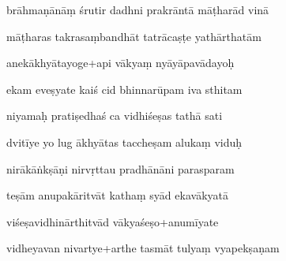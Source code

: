 \documentclass[article,12pt,a4paper]{memoir}%
\newcounter{parCount}
\begin{document}
	  
	  \pstart {} brāhmaṇānāṃ śrutir dadhni prakrāntā māṭharād vinā 
	{}
	\pend%
      

	  
	  \pstart \leavevmode%
	māṭharas takrasaṃbandhāt tatrācaṣṭe yathārthatām 
	{}
	\pend%
      

	  
	  \pstart {} anekākhyātayoge+api vākyaṃ nyāyāpavādayoḥ 
	{}
	\pend%
      

	  
	  \pstart \leavevmode%
	ekam eveṣyate kaiś cid bhinnarūpam iva sthitam 
	{}
	\pend%
      

	  
	  \pstart {} niyamaḥ pratiṣedhaś ca vidhiśeṣas tathā sati 
	{}
	\pend%
      

	  
	  \pstart \leavevmode%
	dvitīye yo lug ākhyātas taccheṣam alukaṃ viduḥ 
	{}
	\pend%
      

	  
	  \pstart {} nirākāṅkṣāṇi nirvṛttau pradhānāni parasparam 
	{}
	\pend%
      

	  
	  \pstart \leavevmode%
	teṣām anupakāritvāt kathaṃ syād ekavākyatā 
	{}
	\pend%
      

	  
	  \pstart {} viśeṣavidhinārthitvād vākyaśeṣo+anumīyate 
	{}
	\pend%
      

	  
	  \pstart \leavevmode%
	vidheyavan nivartye+arthe tasmāt tulyaṃ vyapekṣaṇam 
	{}
	\pend%
      
\end{document}
